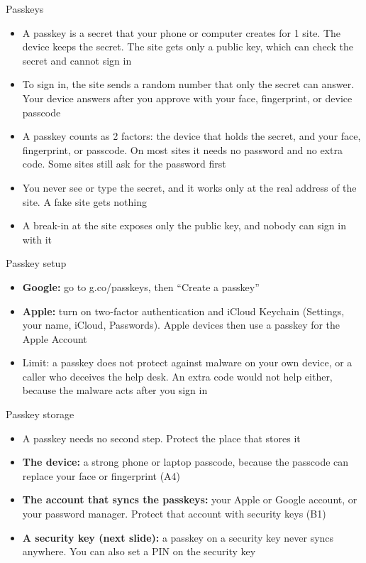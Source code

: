 \documentclass[11pt]{beamer}
\newcommand{\vfy}{\unskip}
\newcommand{\vfy}{\unskip\nobreakspace{\scriptsize\textcolor{citecol}{[verify]}}}
\begin{document}
\begin{frame}{Passkeys}
\pause
\begin{itemize}\setlength\itemsep{8pt}
\item A passkey is a secret that your phone or computer creates for 1 site. The device keeps the secret. The site gets only a public key, which can check the secret and cannot sign in \pause
\item To sign in, the site sends a random number that only the secret can answer. Your device answers after you approve with your face, fingerprint, or device passcode \pause
\item A passkey counts as 2 factors: the device that holds the secret, and your face, fingerprint, or passcode. On most sites it needs no password and no extra code. Some sites still ask for the password first \pause
\item You never see or type the secret, and it works only at the real address of the site. A fake site gets nothing \pause
\item A break-in at the site exposes only the public key, and nobody can sign in with it
\end{itemize}
\end{frame}


\begin{frame}{Passkey setup}
\pause
\begin{itemize}\setlength\itemsep{10pt}
\item \textbf{Google:} go to g.co/passkeys, then ``Create a passkey'' \vfy \pause
\item \textbf{Apple:} turn on two-factor authentication and iCloud Keychain (Settings, your name, iCloud, Passwords). Apple devices then use a passkey for the Apple Account \vfy \pause
\item Limit: a passkey does not protect against malware on your own device, or a caller who deceives the help desk. An extra code would not help either, because the malware acts after you sign in
\end{itemize}
\end{frame}


\begin{frame}{Passkey storage}
\pause
\begin{itemize}\setlength\itemsep{9pt}
\item A passkey needs no second step. Protect the place that stores it \pause
\item \textbf{The device:} a strong phone or laptop passcode, because the passcode can replace your face or fingerprint (A4) \pause
\item \textbf{The account that syncs the passkeys:} your Apple or Google account, or your password manager. Protect that account with security keys (B1) \pause
\item \textbf{A security key (next slide):} a passkey on a security key never syncs anywhere. You can also set a PIN on the security key
\end{itemize}
\end{frame}
\end{document}
